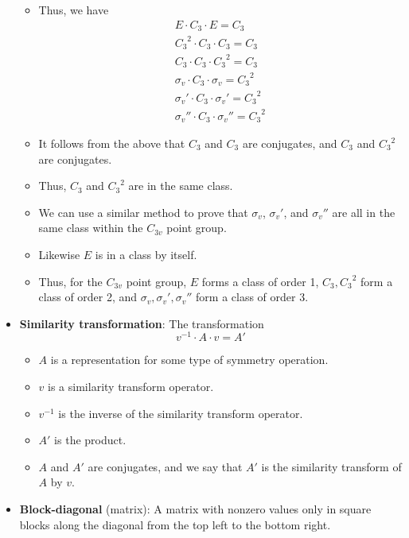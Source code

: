 \documentclass[../notes.tex]{subfiles}
\begin{document}
\begin{itemize}
\begin{itemize}
        \item Thus, we have
        \begin{gather*}
            E\cdot C_3\cdot E = C_3\\
            {C_3}^2\cdot C_3\cdot C_3 = C_3\\
            C_3\cdot C_3\cdot {C_3}^2 = C_3\\
            \sigma_v\cdot C_3\cdot\sigma_v = {C_3}^2\\
            \sigma_v'\cdot C_3\cdot\sigma_v' = {C_3}^2\\
            \sigma_v''\cdot C_3\cdot\sigma_v'' = {C_3}^2
        \end{gather*}
        \item It follows from the above that $C_3$ and $C_3$ are conjugates, and $C_3$ and ${C_3}^2$ are conjugates.
        \item Thus, $C_3$ and ${C_3}^2$ are in the same class.
        \item We can use a similar method to prove that $\sigma_v$, $\sigma_v'$, and $\sigma_v''$ are all in the same class within the $C_{3v}$ point group.
        \item Likewise $E$ is in a class by itself.
        \item Thus, for the $C_{3v}$ point group, $E$ forms a class of order 1, $C_3,{C_3}^2$ form a class of order 2, and $\sigma_v,\sigma_v',\sigma_v''$ form a class of order 3.
    \end{itemize}
    \item \textbf{Similarity transformation}: The transformation
    \begin{equation*}
        v^{-1}\cdot A\cdot v = A'
    \end{equation*}
    \begin{itemize}
        \item $A$ is a representation for some type of symmetry operation.
        \item $v$ is a similarity transform operator.
        \item $v^{-1}$ is the inverse of the similarity transform operator.
        \item $A'$ is the product.
        \item $A$ and $A'$ are conjugates, and we say that $A'$ is the similarity transform of $A$ by $v$.
    \end{itemize}
    \item \textbf{Block-diagonal} (matrix): A matrix with nonzero values only in square blocks along the diagonal from the top left to the bottom right.

\end{itemize}
\end{document}
